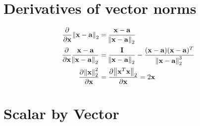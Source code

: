 \section{Derivatives of vector norms}

\begin{align}
\pd{}{\vx}\norm{\vx-\va}_2 &= \frac{\vx-\va}{\norm{\vx-\va}_2} \\
\pd{}{\vx}\frac{\vx-\va}{\norm{\vx-\va}_2} &= \frac{\mI}{\norm{\vx-\va}_2}-\frac{(\vx-\va)(\vx-\va)^T}{\norm{\vx-\va}_2^3} \\
\pd{\norm{\vx}_2^2}{\vx} &= \pd{\norm{\vx^T\vx}_2}{\vx} = 2\vx
\end{align}

\section{Scalar by Vector}
